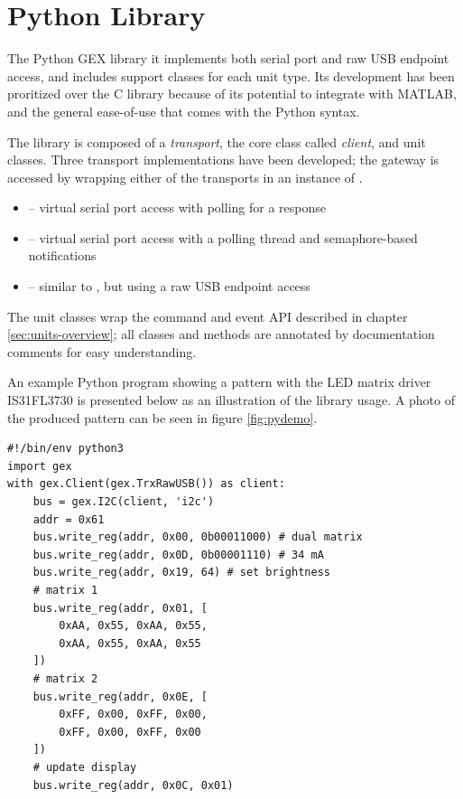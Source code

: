 \section{Python Library}

The Python GEX library it implements both serial port and raw USB endpoint access, and includes support classes for each unit type. Its development has been proritized over the C library because of its potential to integrate with MATLAB, and the general ease-of-use that comes with the Python syntax.

The library is composed of a \textit{transport}, the core class called \textit{client}, and unit classes. Three transport implementations have been developed; the gateway is accessed by wrapping either of the transports in an instance of .

\begin{itemize}
	\item {} -- virtual serial port access with polling for a response
	
	\item {} -- virtual serial port access with a polling thread and semaphore-based notifications
	
	\item {} -- similar to , but using a raw USB endpoint access
\end{itemize}

The unit classes wrap the command and event \gls{API} described in chapter \ref{sec:units-overview}; all classes and methods are annotated by documentation comments for easy understanding.

An example Python program showing a pattern with the \gls{LED} matrix driver IS31FL3730 is presented below as an illustration of the library usage. A photo of the produced pattern can be seen in figure \ref{fig:pydemo}.

\begin{verbatim}
#!/bin/env python3
import gex  
with gex.Client(gex.TrxRawUSB()) as client:
    bus = gex.I2C(client, 'i2c')
    addr = 0x61
    bus.write_reg(addr, 0x00, 0b00011000) # dual matrix
    bus.write_reg(addr, 0x0D, 0b00001110) # 34 mA
    bus.write_reg(addr, 0x19, 64) # set brightness
    # matrix 1
    bus.write_reg(addr, 0x01, [
        0xAA, 0x55, 0xAA, 0x55,
        0xAA, 0x55, 0xAA, 0x55
    ])
    # matrix 2
    bus.write_reg(addr, 0x0E, [
        0xFF, 0x00, 0xFF, 0x00,
        0xFF, 0x00, 0xFF, 0x00
    ])
    # update display
    bus.write_reg(addr, 0x0C, 0x01)
\end{verbatim}

